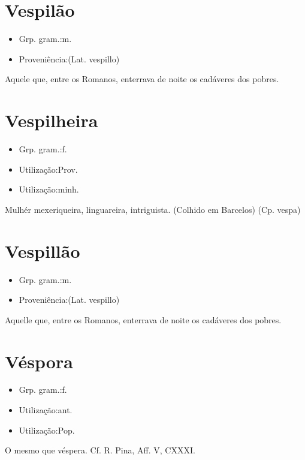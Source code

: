 \documentclass{article}
\begin{document}
\section{Vespilão}
\begin{itemize}
\item {Grp. gram.:m.}
\end{itemize}
\begin{itemize}
\item {Proveniência:(Lat. \textunderscore vespillo\textunderscore )}
\end{itemize}
Aquele que, entre os Romanos, enterrava de noite os cadáveres dos pobres.
\section{Vespilheira}
\begin{itemize}
\item {Grp. gram.:f.}
\end{itemize}
\begin{itemize}
\item {Utilização:Prov.}
\end{itemize}
\begin{itemize}
\item {Utilização:minh.}
\end{itemize}
Mulhér mexeriqueira, linguareira, intriguista. (Colhido em Barcelos)
(Cp. \textunderscore vespa\textunderscore )
\section{Vespillão}
\begin{itemize}
\item {Grp. gram.:m.}
\end{itemize}
\begin{itemize}
\item {Proveniência:(Lat. \textunderscore vespillo\textunderscore )}
\end{itemize}
Aquelle que, entre os Romanos, enterrava de noite os cadáveres dos pobres.
\section{Véspora}
\begin{itemize}
\item {Grp. gram.:f.}
\end{itemize}
\begin{itemize}
\item {Utilização:ant.}
\end{itemize}
\begin{itemize}
\item {Utilização:Pop.}
\end{itemize}
O mesmo que \textunderscore véspera\textunderscore . Cf. R. Pina, \textunderscore Aff. V\textunderscore , CXXXI.
\end{document}
